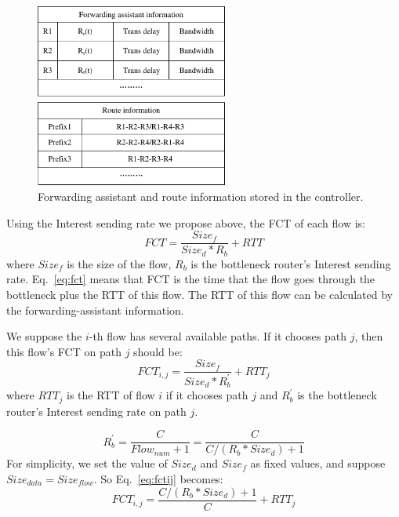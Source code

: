 \begin{figure}[t]
	\centering
	\includegraphics[width=2.5in]{forwarding-assistant-information.pdf}
	\caption{Forwarding assistant and route information stored in the controller.}
	\label{fig-assistant-information}
\end{figure}

Using the Interest sending rate we propose above, the FCT of each flow is:
\begin{equation}
	\label{eq:fct}
	FCT=\frac{Size_{f}}{Size_{d}\ast{R_{b}}}+RTT
\end{equation}
where $Size_{f}$ is the size of the flow, $R_{b}$ is the bottleneck router's Interest sending rate. Eq.~\ref{eq:fct} means that FCT is the time that the flow goes through the bottleneck plus the RTT of this flow. The RTT of this flow can be calculated by the forwarding-assistant information.

We suppose the $i$-th flow has several available paths. If it chooses path $j$, then this flow's FCT on path $j$ should be:
\begin{equation}
	\label{eq:fctij}
	FCT_{i,j}=\frac{Size_{f}}{Size_{d}\ast{R^{'}_{b}}}+RTT_j
\end{equation}
where $RTT_j$ is the RTT of flow $i$ if it chooses path $j$ and $R^{'}_{b}$ is the bottleneck router's Interest sending rate on path $j$.

\begin{equation}
R^{'}_{b}=\frac{C}{Flow_{num}+1} = \frac{C}{C/(R_{b}\ast{Size_{d}})+1}
\end{equation}
For simplicity, we set the value of $Size_{d}$ and $Size_{f}$ as fixed values, and suppose $Size_{data} =Size_{flow}$. So Eq.~\ref{eq:fctij} becomes:
\begin{equation}
FCT_{i,j}=\frac{C/(R_{b}*Size_{d})+1}{C}+RTT_j
\end{equation}

